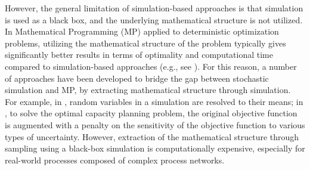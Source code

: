 \documentclass[a4paper, 12pt]{article} %
\begin{document}
However, the general limitation of simulation-based approaches is that simulation is used as a black box, and the underlying mathematical structure is not utilized. 
In Mathematical Programming (MP) applied to deterministic optimization problems, utilizing the mathematical structure of the problem typically gives significantly better results in terms of optimality  and computational time compared to simulation-based approaches (e.g., see \cite{Amaran2016}). 
For this reason, a number of approaches have been developed to bridge the gap between stochastic simulation and MP, by extracting mathematical structure through simulation.
For example, in \cite{thompson_integrated_1990}, random variables in a simulation are resolved to their means;
in \cite{paraskevopoulos_robust_1991}, to solve the optimal capacity planning problem, the original objective function is augmented with a penalty on the sensitivity of the objective function to various types of uncertainty.
However, extraction of the mathematical structure through sampling using a black-box simulation is computationally expensive, especially for real-world processes composed of complex process networks.
\end{document}
